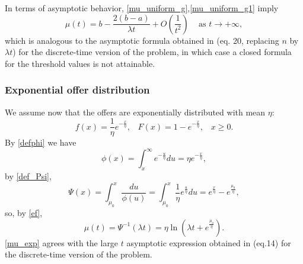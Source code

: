 \documentclass{article}
\numberwithin{equation}{section}
\begin{document}
	
	In terms of asymptotic behavior, \eqref{mu_uniform_g},\eqref{mu_uniform_g1} imply
	\begin{equation}\label{ba0}\mu(t)=b-\frac{2(b-a)}{\lambda t}+O\left(\frac{1}{t^2}\right)\;\;\;{\mbox{ as }} t\rightarrow +\infty,\end{equation}
	which is analogous to the asymptotic 
	formula obtained in \cite{entwistle} (eq. 20, replacing $n$ by $\lambda t$) for the discrete-time version of the problem, in which case a closed formula for the 
	threshold values is not attainable.
	
	
	
	
	\subsubsection{Exponential offer distribution}
	\label{policy_exponential}
	
	We assume now that the offers are exponentially distributed with mean $\eta$:
	\begin{equation}\label{exp}f(x)=\frac{1}{\eta}e^{-\frac{x}{\eta}},\;\;\;F(x)=1-e^{-\frac{x}{\eta}},\;\;\;x\geq 0.
	\end{equation}
	By \eqref{defphi} we have
	\begin{equation}\label{phi_exp}\phi(x)=\int_x^\infty e^{-\frac{u}{\eta}}du=\eta e^{-\frac{x}{\eta}},\end{equation}
	by \eqref{def_Psi},
	$$\Psi(x)=\int_{\mu_0}^x \frac{du}{\phi(u)}=\int_{\mu_0}^x \frac{1}{\eta}e^{\frac{u}{\eta}}du=e^{\frac{x}{\eta}}-e^{\frac{\mu_0}{\eta}},$$
	so, by \eqref{ef},
	\begin{equation}\label{mu_exp}\mu(t)=\Psi^{-1}(\lambda t)=\eta \ln\left(\lambda t+e^{\frac{\mu_0}{\eta}} \right).\end{equation}
	\eqref{mu_exp} agrees
	with the large $t$ asymptotic expression obtained in \cite{entwistle} (eq.14) for the 
	discrete-time version of the problem.
	
\end{document}
